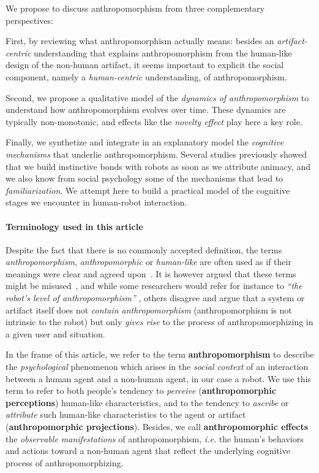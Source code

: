 \documentclass{frontiersSCNS} %
\newcommand{\ie}{\textit{i.e.}\xspace}
\begin{document}
We propose to discuss anthropomorphism from three complementary perspectives: 

First, by reviewing what anthropomorphism actually means: besides an
\emph{artifact-centric} understanding that explains anthropomorphism from the
human-like design of the non-human artifact, it seems important to explicit the
social component, namely a \emph{human-centric} understanding, of
anthropomorphism.

Second, we propose a qualitative model of the \textit{dynamics of
anthropomorphism} to understand how anthropomorphism evolves over time. These
dynamics are typically non-monotonic, and effects like the \emph{novelty effect} play here
a key role.

Finally, we synthetize and integrate in an explanatory model the \emph{cognitive
mechanisms} that underlie anthropomorphism. Several studies previously showed
that we build instinctive bonds with robots as soon as we attribute animacy, and
we also know from social psychology some of the mechanisms that lead to
\emph{familiarization}. We attempt here to build a practical model of the
cognitive stages we encounter in human-robot interaction.


\paragraph{Terminology used in this article\\}

Despite the fact that there is no commonly accepted definition, the terms
\textit{anthropomorphism}, \textit{anthropomorphic} or \textit{human-like} are
often used as if their meanings were clear and agreed
upon~\citep{persson_anthropomorphism_2000}. It is however argued that these
terms might be misused~\citep{duffy_anthropomorphism_2002,epley_when_2008}, and
while some researchers would refer for instance to \textit{``the robot's level
of anthropomorphism''} \citep{bartneck_is_2007,feil-seifer_human-robot_2008},
others disagree and argue that a system or artifact itself does not
\emph{contain anthropomorphism} (anthropomorphism is not intrinsic to the robot)
but only \emph{gives rise} to the process of anthropomorphizing in a given user
and situation.

In the frame of this article, we refer to the term \textbf{anthropomorphism} to
describe the \emph{psychological} phenomenon which arises in the \emph{social
context} of an interaction between a human agent and a non-human agent, in our
case a robot. We use this term to refer to both people's tendency to
\textit{perceive} (\textbf{anthropomorphic perceptions}) human-like
characteristics, and to the tendency to \textit{ascribe} or \textit{attribute}
such human-like characteristics to the agent or artifact
(\textbf{anthropomorphic projections}). Besides, we call {\bf anthropomorphic
effects} the \emph{observable manifestations} of anthropomorphism, \ie the
human's behaviors and actions toward a non-human agent that reflect the
underlying cognitive process of anthropomorphizing.
\end{document}
